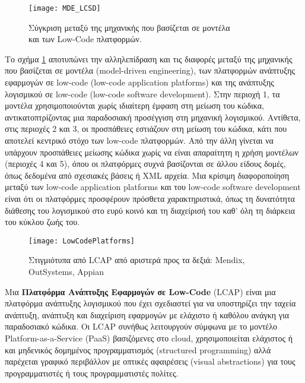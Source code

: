         \begin{figure}[h!] \noindent \centering
                \texttt{[image: MDE\_LCSD]}
                \caption{\centering Σύγκριση μεταξύ της μηχανικής που βασίζεται σε μοντέλα \\ και των Low-Code πλατφορμών. \cite{MDELow}}
                \label{fig:MDE_LCSD}
        \end{figure}

        Το σχήμα \ref{fig:MDE_LCSD} αποτυπώνει την αλληλεπίδραση και τις διαφορές μεταξύ της μηχανικής που βασίζεται σε μοντέλα (model-driven engineering), των πλατφορμών ανάπτυξης εφαρμογών σε low-code (low-code application platforms) και της ανάπτυξης λογισμικού σε low-code (low-code software development). Στην περιοχή 1, τα μοντέλα χρησιμοποιούνται χωρίς ιδιαίτερη έμφαση στη μείωση του κώδικα, αντικατοπτρίζοντας μια παραδοσιακή προσέγγιση στη μηχανική λογισμικού.
        Αντίθετα, στις περιοχές 2 και 3, οι προσπάθειες εστιάζουν στη μείωση του κώδικα, κάτι που αποτελεί κεντρικό στόχο των low-code πλατφορμών. Από την άλλη γίνεται να υπάρχουν προσπάθειες μείωσης κώδικα χωρίς να είναι απαραίτητη η χρήση μοντέλων (περιοχές 4 και 5), όπου οι πλατφόρμες συχνά βασίζονται σε άλλου είδους δομές, όπως δεδομένα από σχεσιακές βάσεις ή XML αρχεία. Μια κρίσιμη διαφοροποίηση μεταξύ των low-code application platforms και του low-code software development είναι ότι οι πλατφόρμες προσφέρουν πρόσθετα χαρακτηριστικά, όπως τη δυνατότητα διάθεσης του λογισμικού στο ευρύ κοινό και τη διαχείρισή του καθ' όλη τη διάρκεια του κύκλου ζωής του.

        \begin{figure}[h!] \noindent \centering
                \texttt{[image: LowCodePlatforms]}
                \caption{Στιγμιότυπα από LCAP από αριστερά προς τα δεξιά: Mendix, OutSystems, Appian \cite{LowCodeMendix}}
        \end{figure}

        Μια \textbf{Πλατφόρμα Ανάπτυξης Εφαρμογών σε Low-Code} (LCAP) είναι μια πλατφόρμα ανάπτυξης λογισμικού που έχει σχεδιαστεί για να υποστηρίζει την ταχεία ανάπτυξη, ανάπτυξη και διαχείριση εφαρμογών με ελάχιστο ή καθόλου ανάγκη για παραδοσιακό κώδικα. Οι LCAP συνήθως λειτουργούν σύμφωνα με το μοντέλο Platform-as-a-Service (PaaS) βασιζόμενες στο cloud, χρησιμοποιείται ελάχιστος ή και μηδενικός δομημένος προγραμματισμός (structured programming) αλλά παρέχεται γραφικό περιβάλλον με οπτικές αφαιρέσεις (visual abstractions) για τους προγραμματιστές ή τους προγραμματιστές πολίτες.

